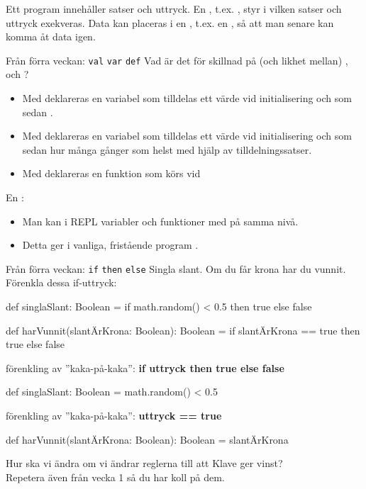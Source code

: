 

\ifkompendium

\noindent Ett program innehåller satser och uttryck. En , t.ex. , styr i vilken  satser och uttryck exekveras. Data kan placeras i en , t.ex. en , så att man senare kan komma åt data igen.    
\fi


\ifkompendium\else
\begin{SlideExtra}{Från förra veckan: \texttt{val} \texttt{var} \texttt{def}}
  Vad är det för skillnad på (och likhet mellan) ,  och ? \pause
  \begin{itemize}
    \item Med  deklareras en variabel som tilldelas ett värde vid initialisering och som sedan .
    \item Med  deklareras en variabel som tilldelas ett värde vid initialisering och som sedan  hur många gånger som helst med hjälp av tilldelningssatser.
    \item Med  deklareras en funktion som körs vid 
  \end{itemize}
  \pause\vspace{1em} En : 
  \begin{itemize}
  \item Man kan i REPL  variabler och funktioner med   på samma nivå. 
  \item Detta ger i vanliga, fristående program . 
  \end{itemize}
\end{SlideExtra}

\begin{SlideExtra}{Från förra veckan: \texttt{if} \texttt{then} \texttt{else}}\SlideFontSmall
{} Singla slant. Om du får krona har du vunnit. \\[0.5em]
Förenkla dessa if-uttryck:
\begin{Code}
def singlaSlant: Boolean = if math.random() < 0.5 then true else false

def harVunnit(slantÄrKrona: Boolean): Boolean = 
  if slantÄrKrona == true then true else false
\end{Code}
\pause förenkling av ''kaka-på-kaka'': \textbf{if uttryck then true else false}
\begin{Code}
def singlaSlant: Boolean = math.random() < 0.5
\end{Code}
\pause förenkling av ''kaka-på-kaka'':  \textbf{uttryck == true}
\begin{Code}
def harVunnit(slantÄrKrona: Boolean): Boolean = slantÄrKrona
\end{Code}
\pause Hur ska vi ändra  om vi ändrar reglerna till att Klave ger vinst? \\
\pause Repetera även  från vecka 1 så du har koll på dem.
\end{SlideExtra}

